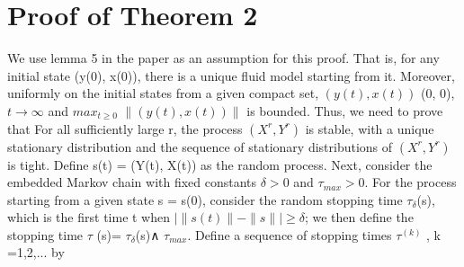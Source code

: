  \section*{Proof of Theorem 2}
 We use lemma 5 in the paper as an assumption for this proof. That is, for any initial state (y(0), x(0)), there is a unique fluid model starting from it. Moreover, uniformly on the initial states from a given compact set, \newline $(y(t), x(t))$ \rightarrow (0, 0), 
  $t \rightarrow \infty$  and $max_{t\geq 0}$ $\|(y(t),x(t))\|$ is bounded.
 \newline\newline Thus, we need to prove that For all sufficiently large r, the process $(X^r,Y^r)$ is stable, with a unique stationary distribution and the sequence of stationary distributions of $(X^r,Y^r)$ is tight.
 \newline\newline
 Define s(t) = (Y(t), X(t)) as the random process. Next,  consider the embedded Markov chain with fixed constants $\delta > 0$ and $\tau_ {max} > 0$. For the process starting from a given state s = s(0), consider the random stopping time $ \tau _\delta $(s), which is the first time t when $| \|s(t)\| - \|s\| | \geq \delta $; we then define the stopping time $\tau$ (s)= $\tau _{\delta}$(s)∧ $\tau_{max}$. Define a sequence of stopping times $\tau^{(k)}$ , k =1,2,... by 
	
